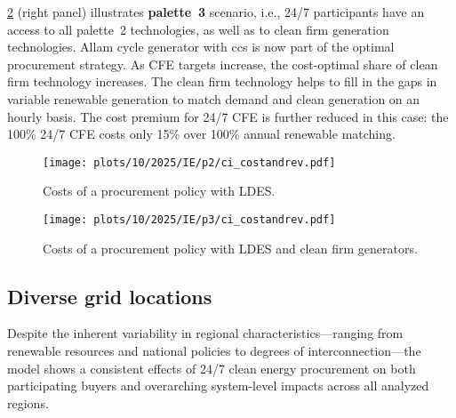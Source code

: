 \cref{fig:10-2025-IE-p3-ci_costandrev} (right panel) illustrates \textbf{palette~3} scenario, i.e., 24/7 participants have an access to all palette~2 technologies, as well as to clean firm generation technologies.
Allam cycle generator with \gls{ccs} is now part of the optimal procurement strategy.
As CFE targets increase, the cost-optimal share of clean firm technology increases.
The clean firm technology helps to fill in the gaps in variable renewable generation to match demand and clean generation on an hourly basis.
The cost premium for 24/7 CFE is further reduced in this case: the 100\% 24/7 CFE costs only 15\% over 100\% annual renewable matching.

\begin{figure*}
    \centering
    \begin{subfigure}{0.5\textwidth}
        \centering
        \caption{Costs of a procurement policy with LDES.}
        \texttt{[image: plots/10/2025/IE/p2/ci\_costandrev.pdf]}
        \label{fig:10-2025-IE-p2-ci_costandrev}
    \end{subfigure}%
    \begin{subfigure}{0.5\textwidth}
        \centering
        \caption{Costs of a procurement policy with LDES and clean firm generators.}
        \texttt{[image: plots/10/2025/IE/p3/ci\_costandrev.pdf]}
        \label{fig:10-2025-IE-p3-ci_costandrev}
    \end{subfigure}
    \caption{The breakdown of costs per procurement policy if \gls{ci} consumers located in Ireland have an access to a wider palette of technologies:
    w/ \gls{ldes} (\cref{fig:10-2025-IE-p2-ci_costandrev});
    w/ \gls{ldes} and clean firm generation technologies (\cref{fig:10-2025-IE-p3-ci_costandrev}).
    }
    \label{fig:10-2025-IE-p23-ci_procurement}
\end{figure*}


\subsection{Diverse grid locations}
\label{subsec:location}

\begin{res}
    Despite the inherent variability in regional charac\-teristics---ranging from renewable resources and national policies to degrees of interconnection---the model shows a consistent effects of 24/7 clean energy procurement on both participating buyers and overarching system-level impacts across all analyzed regions.
\end{res}


